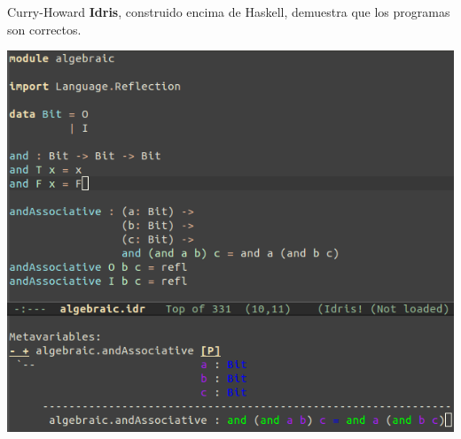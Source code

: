 \begin{frame}[fragile]{Curry-Howard}
  \textbf{Idris}, construido encima de Haskell, demuestra que los
  programas son correctos.
  
  \begin{center}
  \includegraphics[scale=0.28]{./images/idris.png}
  \end{center}
\end{frame}
